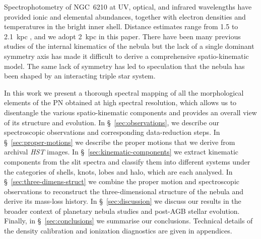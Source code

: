 \documentclass[useAMS, usenatbib]{mnras}
\begin{document}
Spectrophotometry of NGC~6210 at UV, optical, and infrared wavelengths
\citep{Rubin:1997a, Kwitter:1998a, Liu:2004a, Pottasch:2009a, Bohigas:2015c}
have provided ionic and elemental abundances,
together with electron densities and temperatures in the bright inner shell.
Distance estimates range from \num{1.5} to \SI{2.1}{kpc} \citep{Hajian:1995a, Frew:2016a},
and we adopt \SI{2}{kpc} in this paper.
There have been many previous studies of the internal kinematics of the nebula
\citep{Osterbrock:1966a, Weedman:1968a, Becker:1984a, Icke:1989a, Rechy-Garcia:2020a}
but the lack of a single dominant symmetry axis has made it difficult to derive a comprehensive spatio-kinematic model.
The same lack of symmetry has led to speculation \citep{Soker:2004b, Bear:2017a}
that the nebula has been shaped by an interacting triple star system.


In this work we present a thorough spectral mapping of all the morphological elements of the PN obtained at high spectral resolution,
which allows us to disentangle the various spatio-kinematic components
and provides an overall view of its structure and evolution.
In \S~\ref{sec:observations}, we describe our spectroscopic observations and corresponding data-reduction steps.
In \S~\ref{sec:proper-motions} we describe the proper motions that we derive from archival \textit{HST} images.
In \S~\ref{sec:kinematic-components} we extract kinematic components from the slit spectra and classify them into different systems under the categories of shells, knots, lobes and halo, which are each analysed.
In \S~\ref{sec:three-dimens-struct} we combine the proper motion and spectroscopic observations to reconstruct the three-dimensional structure of the nebula and derive its mass-loss history.
In \S~\ref{sec:discussion} we discuss our results in the broader context of planetary nebula studies and post-AGB stellar evolution.
Finally, in \S~\ref{sec:conclusions} we summarise our conclusions.
Technical details of the density calibration
and ionization diagnostics are given in appendices.
\end{document}
